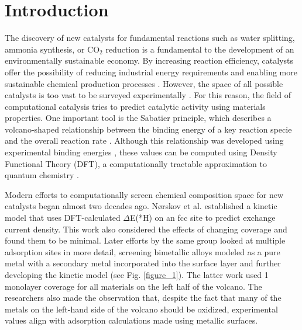 \documentclass[preprint,12pt]{elsarticle}
\begin{document}
\raggedright
\section{Introduction}

The discovery of new catalysts for fundamental reactions such as water splitting, ammonia synthesis, or CO$_2$ reduction is a fundamental to the development of an environmentally sustainable economy. By increasing reaction efficiency, catalysts offer the possibility of reducing industrial energy requirements and enabling more sustainable chemical production processes \cite{osti_1545774}. However, the space of all possible catalysts is too vast to be surveyed experimentally \cite{tran2018active}. For this reason, the field of computational catalysis tries to predict catalytic activity using materials properties. One important tool is the Sabatier principle, which describes a volcano-shaped relationship between the binding energy of a key reaction specie and the overall reaction rate \cite{medford2015Sabatier}. Although this relationship was developed using experimental binding energies \cite{trasatti1972work}, these values can be computed using Density Functional Theory (DFT), a computationally tractable approximation to quantum chemistry \cite{osti_1545774,ooka2021sabatier}.

Modern efforts to computationally screen chemical composition space for new catalysts began almost two decades ago. N{\o}rskov et al. \cite{norskov2005trends} established a kinetic model that uses DFT-calculated $\Delta$E(*H) on an fcc site to predict exchange current density. This work also considered the effects of changing coverage and found them to be minimal. Later efforts by the same group looked at multiple adsorption sites in more detail, screening bimetallic alloys modeled as a pure metal with a secondary metal incorporated into the surface layer \cite{greeley2006computational} and further developing the kinetic model \cite{skulason2010modeling} (see Fig. \ref{figure_1}). The latter work used 1 monolayer coverage for all materials on the left half of the volcano. The researchers also made the observation that, despite the fact that many of the metals on the left-hand side of the volcano should be oxidized, experimental values align with adsorption calculations made using metallic surfaces. 
\end{document}
